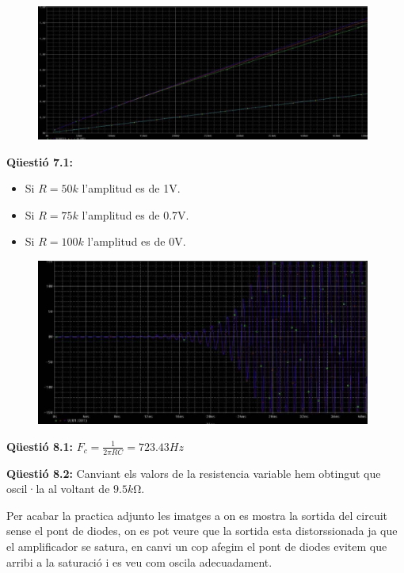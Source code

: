 \documentclass[12pt, a4papre]{article}
\begin{document}
	\begin{figure}[H]
		\begin{center}
		\includegraphics[width=110mm]{6_2.png}
		\end{center}
	\end{figure}
	
	\textbf{Qüestió 7.1:} 
	
	\begin{itemize}
		\item Si $R = 50k$ l'amplitud es de 1V.
		\item Si $R = 75k$ l'amplitud es de 0.7V.
		\item Si $R = 100k$ l'amplitud es de 0V.
	\end{itemize}
	
	\begin{figure}[H]
		\begin{center}
		\includegraphics[width=110mm]{7_1.png}
		\end{center}
	\end{figure}
	
	\textbf{Qüestió 8.1:} $F_c = \frac{1}{2\pi RC} = 723.43Hz$
	
	\textbf{Qüestió 8.2:} Canviant els valors de la resistencia variable hem obtingut que oscil·la al voltant de $9.5k\si{\ohm}$.
	
	Per acabar la practica adjunto les imatges a on es mostra la sortida del circuit sense el pont de diodes, on es pot veure que la sortida esta distorssionada ja que el amplificador se satura, en canvi un cop afegim el pont de diodes evitem que arribi a la saturació i es veu com oscila adecuadament.
	
\end{document}
